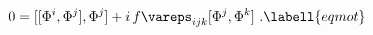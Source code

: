\begin{equation}
0=[[\Phi^i,\Phi^j],\Phi^j]+{i}\,f\vareps_{ijk}[\Phi^j,\Phi^k]\ .
\labell{eqmot}
\end{equation}

